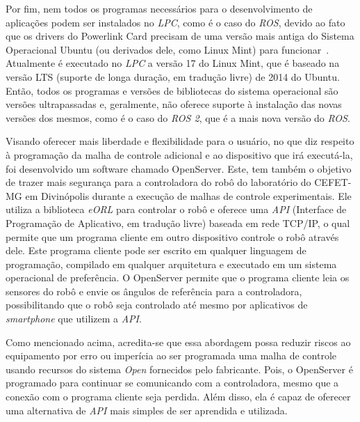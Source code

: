     Por fim, nem todos os programas necessários para o desenvolvimento de aplicações podem ser instalados no \textit{LPC}, como é o caso do \textit{ROS}, devido ao fato que os drivers do Powerlink Card precisam de uma versão mais antiga do Sistema Operacional Ubuntu (ou derivados dele, como Linux Mint) para funcionar~\citep{Bisson:2014}. Atualmente é executado no \textit{LPC} a versão 17 do Linux Mint, que é baseado na versão LTS (suporte de longa duração, em tradução livre) de 2014 do Ubuntu. Então, todos os programas e versões de bibliotecas do sistema operacional são versões ultrapassadas e, geralmente, não oferece suporte à instalação das novas versões dos mesmos, como é o caso do \textit{ROS 2}, que é a mais nova versão do \textit{ROS}.
    
    Visando oferecer mais liberdade e flexibilidade para o usuário, no que diz respeito à programação da malha de controle adicional e ao dispositivo que irá executá-la, foi desenvolvido um software chamado OpenServer. Este, tem também o objetivo de trazer mais segurança para a controladora do robô do laboratório do CEFET-MG em Divinópolis durante a execução de malhas de controle experimentais. Ele utiliza a biblioteca \textit{eORL} para controlar o robô e oferece uma \textit{API} (Interface de Programação de Aplicativo, em tradução livre) baseada em rede TCP/IP, o qual permite que um programa cliente em outro dispositivo controle o robô através dele. Este programa cliente pode ser escrito em qualquer linguagem de programação, compilado em qualquer arquitetura e executado em um sistema operacional de preferência. O OpenServer permite que o programa cliente leia os sensores do robô e envie os ângulos de referência para a controladora, possibilitando que o robô seja controlado até mesmo por aplicativos de \textit{smartphone} que utilizem a \textit{API}.
    
    Como mencionado acima, acredita-se que essa abordagem possa reduzir riscos ao equipamento por erro ou imperícia ao ser programada uma malha de controle usando recursos do sistema \textit{Open} fornecidos pelo fabricante. Pois, o OpenServer é programado para continuar se comunicando com a controladora, mesmo que a conexão com o programa cliente seja perdida. Além disso, ela é capaz de oferecer uma alternativa de \textit{API} mais simples de ser aprendida e utilizada.
